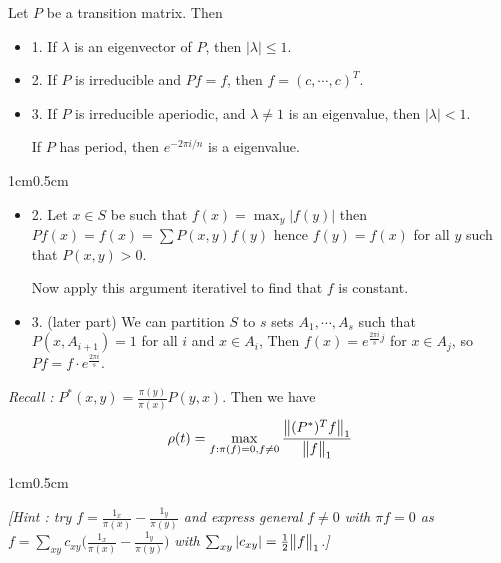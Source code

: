 \documentclass[12pt,a4paper]{article}
\newenvironment{proof}
{\begin{changemargin}{1cm}{0.5cm} 
	}%
	{\end{changemargin}
}
\newenvironment{p}
{\begin{proof} 
	}%
	{\end{proof}
}
\renewenvironment{i}
{\begin{itemize} 
	}%
	{\end{itemize}
}
\begin{document}
 Let $P$ be a transition matrix. Then
\begin{i}
\item[1.] If $\lambda$ is an eigenvector of $P$, then $|\lambda|\leq 1$.
\item[2.] If $P$ is irreducible and $Pf=f$, then $f = (c, \cdots, c)^T$. 
\item[3.] If $P$ is irreducible aperiodic, and $\lambda \neq 1$ is an eigenvalue, then $|\lambda|<1$.

\quad If $P$ has period, then $e^{-2\pi i/n}$ is a eigenvalue.
\end{i}
\begin{p}
\pf \begin{i}
\item[2.] Let $x\in S$ be such that $f(x)= \max_y |f(y)|$ then $Pf(x) = f(x) = \sum P(x,y)f(y)$ hence $f(y) = f(x)$ for all $y$ such that $P(x,y) >0$.

\quad Now apply this argument iterativel to find that $f$ is constant.
\item[3.] (later part) We can partition $S$ to $s$ sets $A_1, \cdots, A_s$ such that $P(x, A_{i+1}) =1$ for all $i$ and $x\in A_i$, Then $f(x) = e^{\frac{2\pi i}{s}j}$ for $x\in A_j$, so $Pf = f\cdot e^{\frac{2\pi i}{s}}$.
\end{i}
\end{p}
\s

\emph{Recall :} $P^*(x,y) = \frac{\pi(y)}{\pi(x)}P(y,x)$. Then we have
\begin{align*}
\rho(t) = \max_{f: \pi(f) =0, f\neq 0} \frac{\bigl\lVert(P^*)^T f\bigr\rVert_{1}}{\bigl\lVert f\bigr\rVert_{1}}  
\end{align*}
\begin{proof}
\emph{[Hint : try $f =\frac{1_x}{\pi(x)} - \frac{1_y}{\pi(y)}$ and express general $f\neq 0$ with $\pi f=0$ as $f=\sum_{xy} c_{xy}\Big(\frac{1_x}{\pi(x)}-\frac{1_y}{\pi(y)} \Big)$ with $\sum_{xy}|c_{xy}|=\frac{1}{2}\bigl\lVert f\bigr\rVert_{1}$.]}
\end{proof}
\s
\end{document}

